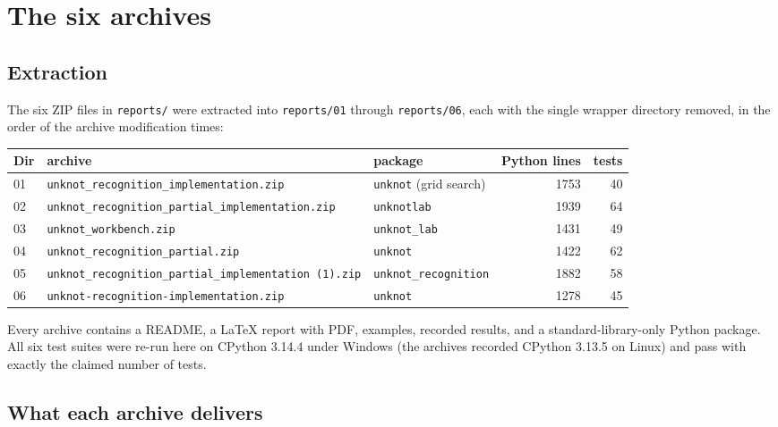 \documentclass[11pt]{article}
\theoremstyle{remark}
\newcommand{\code}[1]{\texttt{#1}}
\begin{document}
\section{The six archives}

\subsection{Extraction}
The six ZIP files in \code{reports/} were extracted into \code{reports/01}
through \code{reports/06}, each with the single wrapper directory removed, in
the order of the archive modification times:

\begin{center}\footnotesize
\begin{tabular}{@{}lllrr@{}}
\toprule
Dir & archive & package & Python lines & tests \\
\midrule
01 & \code{unknot\_recognition\_implementation.zip} & \code{unknot} (grid search) & 1753 & 40 \\
02 & \code{unknot\_recognition\_partial\_implementation.zip} & \code{unknotlab} & 1939 & 64 \\
03 & \code{unknot\_workbench.zip} & \code{unknot\_lab} & 1431 & 49 \\
04 & \code{unknot\_recognition\_partial.zip} & \code{unknot} & 1422 & 62 \\
05 & \code{unknot\_recognition\_partial\_implementation (1).zip} & \code{unknot\_recognition} & 1882 & 58 \\
06 & \code{unknot-recognition-implementation.zip} & \code{unknot} & 1278 & 45 \\
\bottomrule
\end{tabular}
\end{center}

Every archive contains a README, a LaTeX report with PDF, examples, recorded
results, and a standard-library-only Python package. All six test suites were
re-run here on CPython 3.14.4 under Windows (the archives recorded CPython
3.13.5 on Linux) and pass with exactly the claimed number of tests.

\subsection{What each archive delivers}
\end{document}
